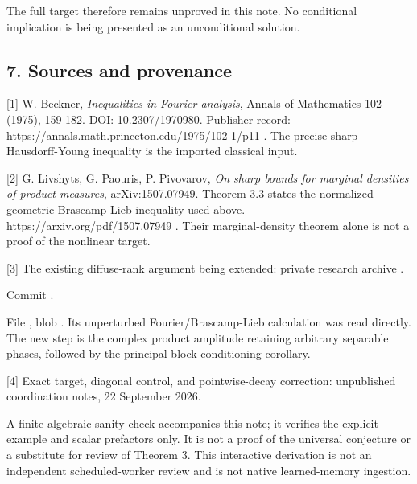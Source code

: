 \documentclass[
  11pt,
]{article}
\begin{document}
The full target therefore remains unproved in this note. No conditional
implication is being presented as an unconditional solution.

\subsection{7. Sources and provenance}\label{sources-and-provenance}

{[}1{]} W. Beckner, \emph{Inequalities in Fourier analysis}, Annals of
Mathematics 102 (1975), 159-182. DOI: 10.2307/1970980. Publisher record:
https://annals.math.princeton.edu/1975/102-1/p11 . The precise sharp
Hausdorff-Young inequality is the imported classical input.

{[}2{]} G. Livshyts, G. Paouris, P. Pivovarov, \emph{On sharp bounds for
marginal densities of product measures}, arXiv:1507.07949. Theorem 3.3
states the normalized geometric Brascamp-Lieb inequality used above.
https://arxiv.org/pdf/1507.07949 . Their marginal-density theorem alone
is not a proof of the nonlinear target.

{[}3{]} The existing diffuse-rank argument being extended: private
research archive .\par
Commit .\par
File ,
blob . Its unperturbed
Fourier/Brascamp-Lieb calculation was read directly. The new step is the
complex product amplitude retaining arbitrary separable phases, followed
by the principal-block conditioning corollary.

{[}4{]} Exact target, diagonal control, and pointwise-decay correction:
unpublished coordination notes, 22 September 2026.\par

A finite algebraic sanity check accompanies this note; it verifies the
explicit example and scalar prefactors only. It is not a proof of the
universal conjecture or a substitute for review of Theorem 3. This
interactive derivation is not an independent scheduled-worker review and
is not native learned-memory ingestion.
\end{document}
